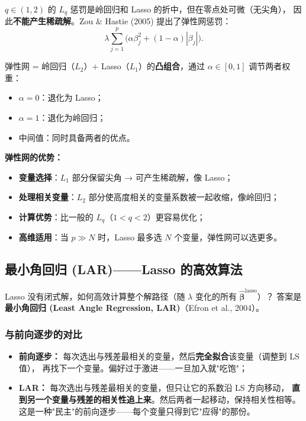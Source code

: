 $q \in (1, 2)$ 的 $L_q$ 惩罚是岭回归和 Lasso 的折中，但在零点处可微（无尖角），
因此\textbf{不能产生稀疏解}。Zou \& Hastie (2005) 提出了弹性网惩罚：
\begin{equation}\label{eq:elastic_net}
    \lambda \sum_{j=1}^{p} \Big(\alpha \beta_j^2 + (1-\alpha) |\beta_j|\Big).
\end{equation}

弹性网 = 岭回归（$L_2$）+ Lasso（$L_1$）的\textbf{凸组合}，通过 $\alpha \in [0,1]$ 调节两者权重：
\begin{itemize}
    \item $\alpha = 0$：退化为 Lasso；
    \item $\alpha = 1$：退化为岭回归；
    \item 中间值：同时具备两者的优点。
\end{itemize}

\textbf{弹性网的优势：}
\begin{itemize}
    \item \textbf{变量选择}：$L_1$ 部分保留尖角 → 可产生稀疏解，像 Lasso；
    \item \textbf{处理相关变量}：$L_2$ 部分使高度相关的变量系数被一起收缩，像岭回归；
    \item \textbf{计算优势}：比一般的 $L_q$（$1<q<2$）更容易优化；
    \item \textbf{高维适用}：当 $p \gg N$ 时，Lasso 最多选 $N$ 个变量，弹性网可以选更多。
\end{itemize}

\subsection{最小角回归 (LAR)——Lasso 的高效算法}

Lasso 没有闭式解，如何高效计算整个解路径（随 $\lambda$ 变化的所有 $\hat{\bm{\beta}}^{\text{lasso}}$）？
答案是\textbf{最小角回归 (Least Angle Regression, LAR)}（Efron et al., 2004）。

\subsubsection{与前向逐步的对比}

\begin{itemize}
    \item \textbf{前向逐步：} 每次选出与残差最相关的变量，然后\textbf{完全拟合}该变量（调整到 LS 值），
    再找下一个变量。偏好过于激进——一旦加入就"吃饱"；
    \item \textbf{LAR：} 每次选出与残差最相关的变量，但只让它的系数沿 LS 方向移动，
    \textbf{直到另一个变量与残差的相关性追上来}。然后两者一起移动，保持相关性相等。
    这是一种"民主"的前向逐步——每个变量只得到它"应得"的那份。
\end{itemize}

